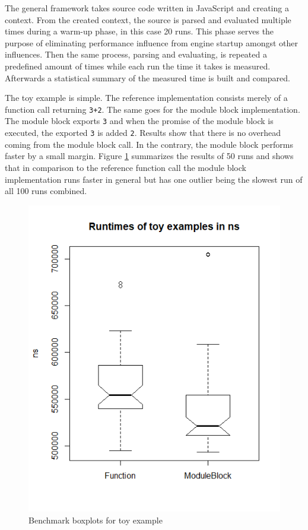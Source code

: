 The general framework takes source code written in JavaScript and creating a context. From the created context, the source is parsed and evaluated multiple times during a warm-up phase, in this case 20 runs. This phase serves the purpose of eliminating performance influence from engine startup amongst other influences. Then the same process, parsing and evaluating, is repeated a predefined amount of times while each run the time it takes is measured. Afterwards a statistical summary of the measured time is built and compared.

The toy example is simple. The reference implementation consists merely of a function call returning \texttt{3+2}. The same goes for the module block implementation. The module block exports \texttt{3} and when the promise of the module block is executed, the exported \texttt{3} is added \texttt{2}. Results show that there is no overhead coming from the module block call. In the contrary, the module block performs faster by a small margin. Figure \ref{fig:bToy} summarizes the results of 50 runs and shows that in comparison to the reference function call the module block implementation runs faster in general but has one outlier being the slowest run of all 100 runs combined.

\begin{figure}[h!]
    \centering
    \includegraphics[scale=0.7]{figures/runtimesToyBoxplot.png}
    \caption{Benchmark boxplots for toy example}
    \label{fig:bToy}
\end{figure}

